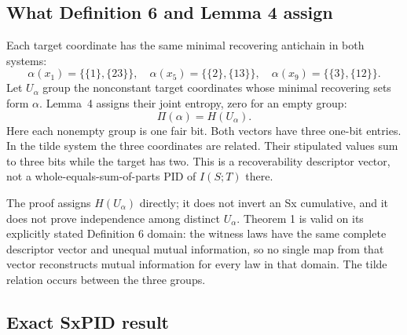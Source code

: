 \documentclass[11pt]{article}
\begin{document}
\subsection{What Definition 6 and Lemma 4 assign}

Each target coordinate has the same minimal recovering antichain in both
systems:
\begin{equation}
\alpha(x_1)=\{\{1\},\{23\}\},\quad
\alpha(x_5)=\{\{2\},\{13\}\},\quad
\alpha(x_9)=\{\{3\},\{12\}\}.
\label{eq:access-labels}
\end{equation}
Let $U_\alpha$ group the nonconstant target coordinates whose minimal recovering
sets form $\alpha$.  Lemma~4 assigns their joint entropy, zero for an empty group:
\begin{equation}
\Pi(\alpha)=H(U_\alpha).
\label{eq:descriptor}
\end{equation}
Here each nonempty group is one fair bit. Both vectors have three one-bit entries.
In the tilde system the three coordinates are related.  Their stipulated
values sum to three bits while the target has two.  This is a recoverability
descriptor vector, not a whole-equals-sum-of-parts PID of $I(S;T)$ there.

The proof assigns $H(U_\alpha)$ directly; it does not invert an Sx cumulative,
and it does not prove independence among distinct $U_\alpha$.  Theorem 1 is
valid on its explicitly stated Definition 6 domain: the witness laws have the
same complete descriptor vector and unequal mutual information, so no single
map from that vector reconstructs mutual information for every law in that
domain.  The tilde relation occurs between the three groups.

\subsection{Exact SxPID result}
\end{document}
